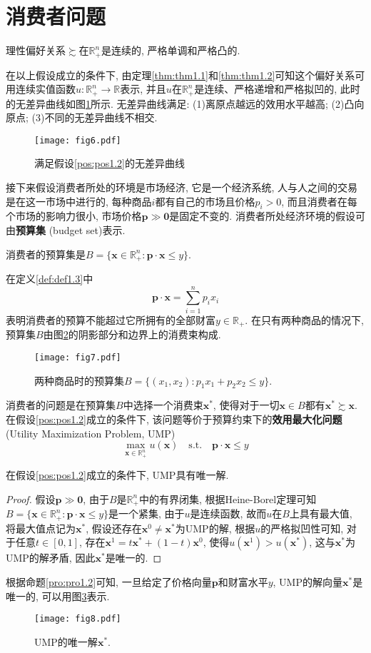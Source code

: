 \documentclass[cn, 12pt, math=mtpro2, bibstyle=apa, blue, twocol]{elegantbook}
\newcommand{\R}{\mathbb{R}}
\newcommand{\p}{\mathbf{p}}
\newcommand{\x}{\mathbf{x}}
\begin{document}
\section{消费者问题}
\begin{postulate}\label{pos:pos1.2}
理性偏好关系$\succsim$在$\R_+^n$是连续的, 严格单调和严格凸的.
\end{postulate}
在以上假设成立的条件下, 由定理\ref{thm:thm1.1}和\ref{thm:thm1.2}可知这个偏好关系可用连续实值函数$u:\R^n_+\to\R$表示, 并且$u$在$\R^n_+$是连续、严格递增和严格拟凹的, 此时的无差异曲线如图\ref{fig1.6}所示. 无差异曲线满足: (1)离原点越远的效用水平越高; (2)凸向原点; (3)不同的无差异曲线不相交.
\begin{figure}[htbp!]
  \centering
  \texttt{[image: fig6.pdf]}
  \caption{满足假设\ref{pos:pos1.2}的无差异曲线}\label{fig1.6}
\end{figure}

接下来假设消费者所处的环境是市场经济, 它是一个经济系统, 人与人之间的交易是在这一市场中进行的, 每种商品$i$都有自己的市场且价格$p_i>0$, 而且消费者在每个市场的影响力很小, 市场价格$\p\gg\mathbf{0}$是固定不变的. 消费者所处经济环境的假设可由\textbf{预算集} (budget set)表示.
\begin{definition}\label{def:def1.3}
消费者的预算集是$B=\{\x\in\R_+^n: \mathbf{p}\cdot\x\leq y\}$.
\end{definition}
在定义\ref{def:def1.3}中
$$\p\cdot\x=\sum_{i=1}^{n}p_ix_i$$
表明消费者的预算不能超过它所拥有的全部财富$y\in \R_+$. 在只有两种商品的情况下, 预算集$B$由图\ref{fig1.7}的阴影部分和边界上的消费束构成.
\begin{figure}[htbp!]
  \centering
  \texttt{[image: fig7.pdf]}
  \caption{两种商品时的预算集$B=\{(x_1,x_2): p_1x_1+p_2x_2\leq y\}$.}\label{fig1.7}
\end{figure}

消费者的问题是在预算集$B$中选择一个消费束$\x^\ast$, 使得对于一切$\x\in B$都有$\x^\ast\succsim \x$. 在假设\ref{pos:pos1.2}成立的条件下, 该问题等价于预算约束下的\textbf{效用最大化问题} (Utility Maximization Problem, UMP)
\begin{equation}\label{eq1.3}
  \max_{\x\in\R^n_+} u(\x)\quad \text{s.t.}\quad \p\cdot\x\leq y
\end{equation}
\begin{proposition}\label{pro:pro1.2}
在假设\ref{pos:pos1.2}成立的条件下, UMP具有唯一解.
\end{proposition}
\begin{proof}
  假设$\p\gg\mathbf{0}$, 由于$B$是$\R^n_+$中的有界闭集, 根据Heine-Borel定理可知$B=\{\x\in\R_+^n:\p\cdot\x\leq y\}$是一个紧集, 由于$u$是连续函数, 故而$u$在$B$上具有最大值, 将最大值点记为$\x^\ast$, 假设还存在$\x^0\neq \x^\ast$为UMP的解, 根据$u$的严格拟凹性可知, 对于任意$t\in [0,1]$, 存在$\x^1=t\x^\ast+(1-t)\x^0$, 使得$u(\x^1)>u(\x^\ast)$, 这与$\x^\ast$为UMP的解矛盾, 因此$\x^\ast$是唯一的.
\end{proof}
根据命题\ref{pro:pro1.2}可知, 一旦给定了价格向量$\p$和财富水平$y$, UMP的解向量$\x^\ast$是唯一的, 可以用图\ref{fig1.8}表示.
\begin{figure}[htbp!]
  \centering
  \texttt{[image: fig8.pdf]}
  \caption{UMP的唯一解$\x^\ast$.}\label{fig1.8}
\end{figure}
\end{document}
